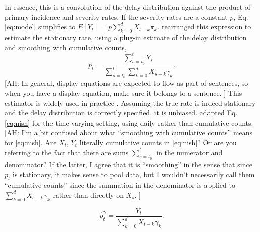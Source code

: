 \documentclass{article}
\newcommand{\ahcomment}[1]{{\color{red}[AH: #1]}}
\begin{document}
\noindent In essence, this is a convolution of the delay distribution against the product of primary incidence and severity rates. If the severity rates are a constant $p$, Eq. \eqref{eq:model} simplifies to $E[Y_t] = p\sum_{k=0}^d X_{t-k}\pi_k$. \citet{nishiura} rearranged this expression to estimate the stationary rate, using a plug-in estimate of the delay distribution and smoothing with cumulative counts,
\begin{equation}\label{eq:nish}
    \hat{p}_t = \frac{\sum_{s=t_0}^t Y_s}{\sum_{s=t_0}^t \sum_{k=0}^d X_{s-k}\gamma_k}.
\end{equation}
\ahcomment{
  In general, display equations are expected to flow as part of sentences,
  so when you have a display equation, make sure it belongs to a sentence.
}
This estimator is widely used in practice \citep{nishiuraEx1, nishiuraEx2, Russell2020}. Assuming the true rate is indeed stationary and the delay distribution is correctly specified, it is unbiased. \citet{UKpaper} adapted Eq. \eqref{eq:nish} for the time-varying setting, using daily rather than cumulative counts:
\ahcomment{
  I'm a bit confused about what ``smoothing with cumulative counts'' means for
  \eqref{eq:nish}.  Are $X_t$, $Y_t$ literally cumulative counts in
  \eqref{eq:nish}?  Or are you referring to the fact that there are sums
  $\sum_{s=t_0}^t$ in the numerator and denominator?  If the latter, I agree
  that it is ``smoothing'' in the sense that since $p_t$ is stationary, it
  makes sense to pool data, but I wouldn't necessarily call them
  ``cumulative counts'' since the summation in the denominator is applied
  to $\sum_{k=0}^{d} X_{s-k}\gamma_k$ rather than directly on $X_s$.
}

\begin{equation}\label{eq:conv}
    \hat{p}_t^{\gamma} = \frac{Y_t}{\sum_{k=0}^d X_{t-k}\gamma_k}.%
\end{equation}
\end{document}
